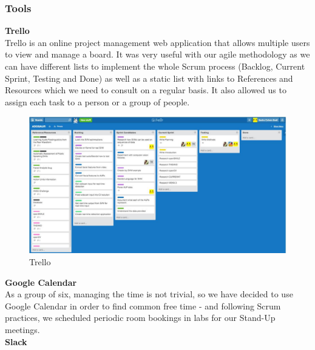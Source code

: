 \documentclass{article}
\begin{document}
\subsubsection{Tools}
\textbf{Trello\cite{trello}}\\

Trello is an online project management web application that allows multiple users to view and manage a board. It was very useful with our agile methodology as we can have different lists to implement the whole Scrum process (Backlog, Current Sprint, Testing and Done) as well as a static list with links to References and Resources which we need to consult on a regular basis. It also allowed us to assign each task to a person or a group of people.\\
\begin{figure}[H]

\centering

\includegraphics[scale=0.6]{trello}
\caption{Trello}
\end{figure}

\textbf{Google Calendar\cite{googlecal}}\\
As a group of six, managing the time is not trivial, so we have decided to use Google Calendar in order to find common free time - and following Scrum practices, we scheduled periodic room bookings in labs for our Stand-Up meetings.\\

\textbf{Slack\cite{slack}}\\
\end{document}
